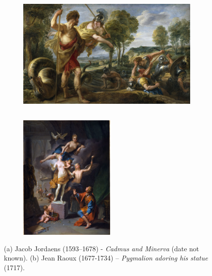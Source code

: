 \begin{figure}[t]
\centering
    \begin{subfigure}[b]{0.68\textwidth}
        \centering
        \includegraphics[height=6.25cm]{chapter_introduction/figures/cadmus.jpg}
        \caption{}
        \label{fig:cadmus}
    \end{subfigure}
    \hfill
    \begin{subfigure}[b]{0.31\textwidth}
        \centering
        \includegraphics[height=6.25cm]{chapter_introduction/figures/galatea.jpg}
        \caption{}
        \label{fig:galatea}
    \end{subfigure}
    \caption[Art and robotics]{(a) Jacob Jordaens (1593–1678) - \emph{Cadmus and Minerva} (date not known). (b) Jean Raoux (1677-1734) – \emph{Pygmalion adoring his statue} (1717).}
	\label{fig:art}
\end{figure}
